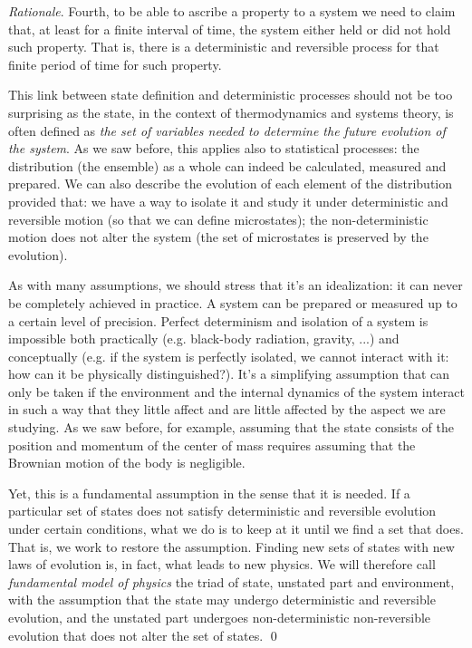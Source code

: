 \documentclass[aps,pra,10pt,twocolumn,floatfix,nofootinbib]{revtex4-1}
\numberwithin{equation}{section}
\theoremstyle{definition}
\newenvironment{rationale}{\emph{Rationale}.}{\qed}
\begin{document}
\begin{rationale}
Fourth, to be able to ascribe a property to a system we need to claim that, at least for a finite interval of time, the system either held or did not hold such property. That is, there is a deterministic and reversible process for that finite period of time for such property.

This link between state definition and deterministic processes should not be too surprising as the state, in the context of thermodynamics and systems theory, is often defined as \emph{the set of variables needed to determine the future evolution of the system}. As we saw before, this applies also to statistical processes: the distribution (the ensemble) as a whole can indeed be calculated, measured and prepared. We can also describe the evolution of each element of the distribution provided that: we have a way to isolate it and study it under deterministic and reversible motion (so that we can define microstates); the non-deterministic motion does not alter the system (the set of microstates is preserved by the evolution).

As with many assumptions, we should stress that it's an idealization: it can never be completely achieved in practice. A system can be prepared or measured up to a certain level of precision. Perfect determinism and isolation of a system is impossible both practically (e.g. black-body radiation, gravity, ...) and conceptually (e.g. if the system is perfectly isolated, we cannot interact with it: how can it be physically distinguished?). It's a simplifying assumption that can only be taken if the environment and the internal dynamics of the system interact in such a way that they little affect and are little affected by the aspect we are studying. As we saw before, for example, assuming that the state consists of the position and momentum of the center of mass requires assuming that the Brownian motion of the body is negligible.

Yet, this is a fundamental assumption in the sense that it is needed. If a particular set of states does not satisfy deterministic and reversible evolution under certain conditions, what we do is to keep at it until we find a set that does. That is, we work to restore the assumption. Finding new sets of states with new laws of evolution is, in fact, what leads to new physics. We will therefore call \emph{fundamental model of physics} the triad of state, unstated part and environment, with the assumption that the state may undergo deterministic and reversible evolution, and the unstated part undergoes non-deterministic non-reversible evolution that does not alter the set of states.
\end{rationale}
\end{document}
